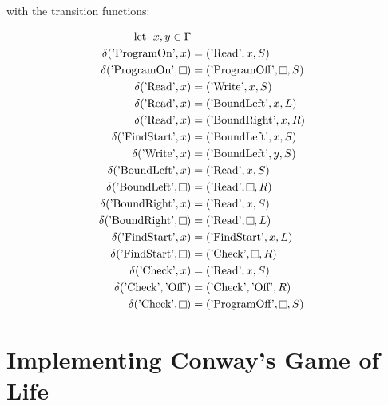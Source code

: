 with the transition functions:

\[
    \begin{aligned}
        \text{let \hspace{0.1cm}} x, y \in \Gamma\\
        \delta (\text{'ProgramOn'}, x) &= (\text{'Read'}, x, S)\\
        \delta (\text{'ProgramOn'}, \raisebox{0.1cm}{\fbox{}}) &= (\text{'ProgramOff'}, \raisebox{0.1cm}{\fbox{}}, S)\\
%
        \delta (\text{'Read'}, x) &= (\text{'Write'}, x, S)\\
        \delta (\text{'Read'}, x) &= (\text{'BoundLeft'}, x, L)\\
        \delta (\text{'Read'}, x) &= (\text{'BoundRight'}, x, R)\\
        \delta (\text{'FindStart'}, x) &= (\text{'BoundLeft'}, x, S)\\
%
        \delta (\text{'Write'}, x) &= (\text{'BoundLeft'}, y, S)\\
%
        \delta (\text{'BoundLeft'}, x) &= (\text{'Read'}, x, S)\\
        \delta (\text{'BoundLeft'}, \raisebox{0.1cm}{\fbox{}}) &= (\text{'Read'}, \raisebox{0.1cm}{\fbox{}}, R)\\
%
        \delta (\text{'BoundRight'}, x) &= (\text{'Read'}, x, S)\\
        \delta (\text{'BoundRight'}, \raisebox{0.1cm}{\fbox{}}) &= (\text{'Read'}, \raisebox{0.1cm}{\fbox{}}, L)\\
%
        \delta (\text{'FindStart'}, x) &= (\text{'FindStart'}, x, L)\\
        \delta (\text{'FindStart'}, \raisebox{0.1cm}{\fbox{}}) &= (\text{'Check'}, \raisebox{0.1cm}{\fbox{}}, R)\\
%
        \delta (\text{'Check'}, x) &= (\text{'Read'}, x, S)\\
        \delta (\text{'Check'}, \text{'Off'}) &= (\text{'Check'}, \text{'Off'}, R)\\
        \delta (\text{'Check'}, \raisebox{0.1cm}{\fbox{}}) &= (\text{'ProgramOff'}, \raisebox{0.1cm}{\fbox{}}, S)\\
    \end{aligned}
\]

\section{Implementing Conway's Game of Life}\label{sec:ImplementCGoL}

